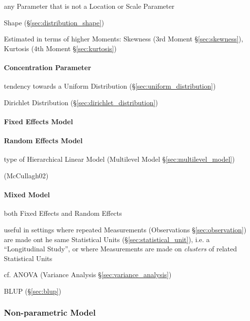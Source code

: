 any Parameter that is not a Location or Scale Parameter

\fist Shape (\S\ref{sec:distribution_shape})

Estimated in terms of higher Moments: Skewness (3rd Moment
\S\ref{sec:skewness}), Kurtosis (4th Moment \S\ref{sec:kurtosis})



\paragraph{Concentration Parameter}\label{sec:concentration_parameter}\hfill

tendency towards a Uniform Distribution (\S\ref{sec:uniform_distribution})

Dirichlet Distribution (\S\ref{sec:dirichlet_distribution})



\paragraph{Fixed Effects Model}\label{sec:fixed_effect}\hfill

\paragraph{Random Effects Model}\label{sec:random_effect}\hfill

type of Hierarchical Linear Model (Multilevel Model
\S\ref{sec:multilevel_model})

(McCullagh02)



\paragraph{Mixed Model}\label{sec:mixed_model}\hfill

both Fixed Effects and Random Effects

useful in settings where repeated Measurements (Observations
\S\ref{sec:observation}) are made ont he same Statistical Units
(\S\ref{sec:statistical_unit}), i.e. a ``Longitudinal Study'', or where
Measurements are made on \emph{clusters} of related Statistical Units

cf. ANOVA (Variance Analysis \S\ref{sec:variance_analysis})

BLUP (\S\ref{sec:blup})



\subsubsection{Non-parametric Model}\label{sec:nonparametric_model}

